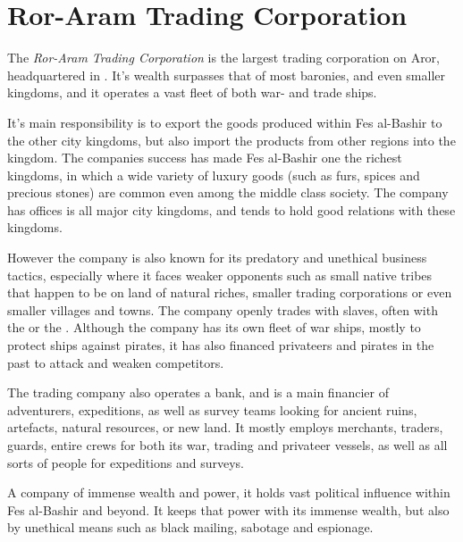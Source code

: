\section{Ror-Aram Trading Corporation}
\label{sec:Ror-Aram Trading Corporation}

The \emph{Ror-Aram Trading Corporation} is the largest trading corporation on
Aror, headquartered in . It's wealth surpasses
that of most baronies, and even smaller kingdoms, and it operates a vast fleet
of both war- and trade ships.

It's main responsibility is to export the goods produced within Fes al-Bashir
to the other city kingdoms, but also import the products from other regions
into the kingdom. The companies success has made Fes al-Bashir one the richest
kingdoms, in which a wide variety of luxury goods (such as furs, spices and
precious stones) are common even among the middle class society. The company
has offices is all major city kingdoms, and tends to hold good relations with
these kingdoms.

However the company is also known for its predatory and unethical business
tactics, especially where it faces weaker opponents such as small native
tribes that happen to be on land of natural riches, smaller trading
corporations or even smaller villages and towns. The company openly trades
with slaves, often with the  or the
. Although the company has its own fleet of war
ships, mostly to protect ships against pirates, it has also financed
privateers and pirates in the past to attack and weaken competitors.

The trading company also operates a bank, and is a main financier of
adventurers, expeditions, as well as survey teams looking for ancient ruins,
artefacts, natural resources, or new land. It mostly employs merchants,
traders, guards, entire crews for both its war, trading and privateer vessels,
as well as all sorts of people for expeditions and surveys.

A company of immense wealth and power, it holds vast political influence
within Fes al-Bashir and beyond. It keeps that power with its immense
wealth, but also by unethical means such as black mailing, sabotage and
espionage.
